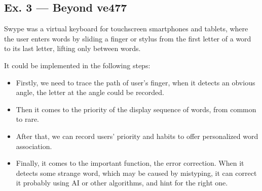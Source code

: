 \documentclass[12pt, a4paper]{article}
\begin{document}
\begin{enumerate}
\newpage
\section*{Ex. 3 --- Beyond ve477}
Swype was a virtual keyboard for touchscreen smartphones and tablets, 
where the user enters words by sliding a finger or stylus from the first letter of a word to its last letter, 
lifting only between words.

It could be implemented in the following steps:
\begin{itemize}
    \item Firstly, we need to trace the path of user's finger, when it detects an obvious angle, 
          the letter at the angle could be recorded.
    \item Then it comes to the priority of the display sequence of words, from common to rare.
    \item After that, we can record users' priority and habits to offer personalized word association.
    \item Finally, it comes to the important function, the error correction. When it detects some strange word, 
          which may be caused by mistyping, it can correct it probably using AI or other algorithms, and hint for the right one.
\end{itemize}
          
\end{enumerate}
\end{document}
